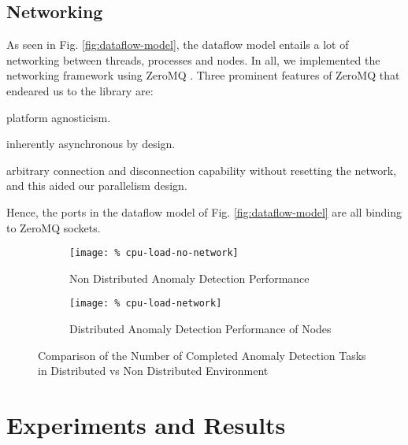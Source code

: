 \subsection{Networking}
As seen in Fig. \ref{fig:dataflow-model}, the dataflow model 
entails a lot of networking between threads, processes and 
nodes. In all, we implemented the networking framework using 
ZeroMQ \cite{zeromq}. Three 
prominent features of ZeroMQ that endeared us to the library 
are:
\begin{enumerate*}[label={\alph*)},font={\bfseries}]
	\item platform agnosticism.
	\item inherently asynchronous by design.
	\item arbitrary connection and disconnection capability 
	without resetting the network, and this aided our 
	parallelism design.
\end{enumerate*}
Hence, the ports in the dataflow model of Fig. 
\ref{fig:dataflow-model} are all binding to 
ZeroMQ sockets.
\begin{figure*}
	\centering
	\begin{subfigure}{0.5\textwidth}
		\centering
		\texttt{[image: \%
			cpu-load-no-network]}
		\caption{Non Distributed Anomaly Detection 
		Performance}
		\label{fig:Standlone}
	\end{subfigure}%
	\begin{subfigure}{0.5\textwidth}
		\centering
		\texttt{[image: \%
			cpu-load-network]}
		\caption{Distributed Anomaly Detection Performance of 
			Nodes}
		\label{fig:distributed}
	\end{subfigure}
	\caption{Comparison of the Number of Completed Anomaly 
		Detection Tasks in Distributed vs Non Distributed 
		Environment}
	\label{fig:comparison-of-performance}
\end{figure*}
\section{Experiments and Results}
\label{sec:experiments/results}
